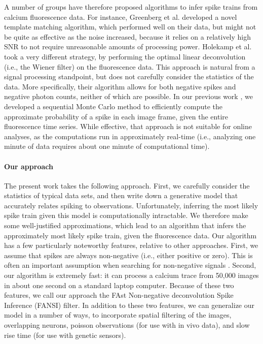 A number of groups have therefore proposed algorithms to infer spike trains from calcium fluorescence data.  For instance, Greenberg et al. \cite{GreenbergKerr08} developed a novel template matching algorithm, which performed well on their data, but might not be quite as effective as the noise increased, because it relies on a relatively high SNR to not require unreasonable amounts of processing power.  Holekamp et al. \cite{HolekampHoly08} took a very different strategy, by performing the optimal linear deconvolution (i.e., the Wiener filter) on the fluorescence data.  This approach is natural from a signal processing standpoint, but does not carefully consider the statistics of the data.  More specifically, their algorithm allows for both negative spikes and negative photon counts, neither of which are possible.  In our previous work \cite{VogelsteinPaninski09b}, we developed a sequential Monte Carlo method to efficiently compute the approximate probability of a spike in each image frame, given the entire fluorescence time series.   While effective, that approach is not suitable for online analyses, as the computations run in approximately real-time (i.e., analyzing one minute of data requires about one minute of computational time).

\paragraph{Our approach}

The present work takes the following approach.  First, we carefully consider the statistics of typical data sets, and then write down a generative model that accurately relates spiking to observations. Unfortunately, inferring the most likely spike train given this model is computationally intractable.  We therefore make some well-justified approximations, which lead to an algorithm that infers the approximately most likely spike train, given the fluorescence data.  Our algorithm has a few particularly noteworthy features, relative to other approaches.  First, we assume that spikes are always non-negative (i.e., either positive or zero).  This is often an important assumption when searching for non-negative signals \cite{LeeSeung99, LeeSeung01, HuysPaninski06}.  Second, our algorithm is extremely fast: it can process a calcium trace from 50,000 images in about one second on a standard laptop computer.  Because of these two features, we call our approach the FAst Non-negative deconvolution Spike Inference (FANSI) filter. In addition to these two features, we can generalize our model in a number of ways, to incorporate spatial filtering of the images, overlapping neurons, poisson observations (for use with in vivo data), and slow rise time (for use with genetic sensors).  


